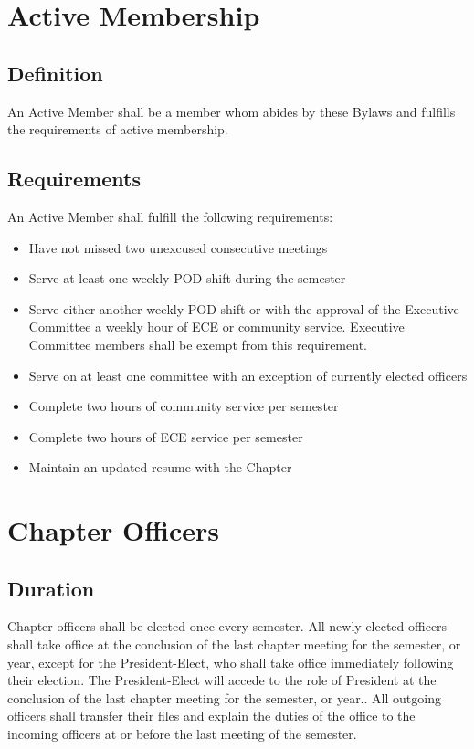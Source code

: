 \documentclass[10pt, oneside]{article}
\begin{document}
\section{Active Membership}
\subsection{Definition}
An Active Member shall be a member whom abides by these Bylaws and fulfills the requirements of active membership.
\subsection{Requirements}
An Active Member shall fulfill the following requirements:
\begin{itemize}
\item Have not missed two unexcused consecutive meetings
\item Serve at least one weekly POD shift during the semester
\item Serve either another weekly POD shift or with the approval of the Executive Committee a weekly hour of ECE or community service. Executive Committee members shall be exempt from this requirement.
\item Serve on at least one committee with an exception of currently elected officers
\item Complete two hours of community service per semester
\item Complete two hours of ECE service per semester
\item Maintain an updated resume with the Chapter
\end{itemize}

\section{Chapter Officers}
\subsection{Duration}
Chapter officers shall be elected once every semester. All newly elected officers shall take office at the conclusion of the last chapter meeting for the semester, or year, except for the President-Elect, who shall take office immediately following their election. The President-Elect will accede to the role of President at the conclusion of the last chapter meeting for the semester, or year..  All outgoing officers shall transfer their files and explain the duties of the office to the incoming officers at or before the last meeting of the semester. 
\end{document}
